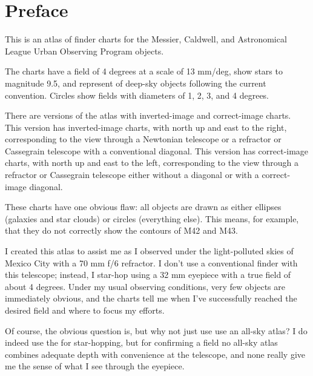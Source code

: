 
\chapter*{Preface}

This is an atlas of finder charts for the Messier, Caldwell, and Astronomical League Urban Observing Program objects. 

The charts have a field of 4 degrees at a scale of 13 mm/deg, show stars to magnitude 9.5, and represent of deep-sky objects following the current convention. Circles show fields with diameters of 1, 2, 3, and 4 degrees.

There are versions of the atlas with inverted-image and correct-image charts. 
\ifinverted
This version has inverted-image charts, with north up and east to the right, corresponding to the view through a Newtonian telescope or a refractor or Cassegrain telescope with a conventional diagonal.
\else
This version has correct-image charts, with north up and east to the left, corresponding to the view through a refractor or Cassegrain telescope either without a diagonal or with a correct-image diagonal.
\fi

These charts have one obvious flaw: all objects are drawn as either ellipses (galaxies and star clouds) or circles (everything else). This means, for example, that they do not correctly show the contours of M42 and M43.

I created this atlas to assist me as I observed under the light-polluted skies of Mexico City with a 70 mm f/6 refractor. I don't use a conventional finder with this telescope; instead, I star-hop using a 32 mm eyepiece with a true field of about 4 degrees. Under my usual observing conditions, very few objects are immediately obvious, and the charts tell me when I've successfully reached the desired field and where to focus my efforts.

Of course, the obvious question is, but why not just use use an all-sky atlas? I do indeed use the {\PSA} for star-hopping, but for confirming a field no all-sky atlas combines adequate depth with convenience at the telescope, and none really give me the sense of what I see through the eyepiece.


